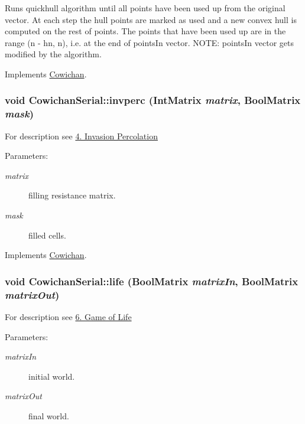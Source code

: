 Runs quickhull algorithm until all points have been used up from the original vector. At each step the hull points are marked as used and a new convex hull is computed on the rest of points. The points that have been used up are in the range (n - hn, n), i.e. at the end of pointsIn vector. NOTE: pointsIn vector gets modified by the algorithm. 

Implements \hyperlink{class_cowichan_0c6b68ae3c059b66893405f8530a2e0a}{Cowichan}.\hypertarget{class_cowichan_serial_9b1cf3fcbb40498609826433b8ea2f6a}{
\subsubsection[{invperc}]{\setlength{\rightskip}{0pt plus 5cm}void CowichanSerial::invperc ({\bf IntMatrix} {\em matrix}, \/  {\bf BoolMatrix} {\em mask})}}
\label{class_cowichan_serial_9b1cf3fcbb40498609826433b8ea2f6a}


For description see \hyperlink{index_invperc_sec}{4. Invasion Percolation} \begin{Desc}
\item[Parameters:]
\begin{description}
\item[{\em matrix}]filling resistance matrix. \item[{\em mask}]filled cells. \end{description}
\end{Desc}


Implements \hyperlink{class_cowichan_ea126792a31e54a8722663b7ea768955}{Cowichan}.\hypertarget{class_cowichan_serial_ffd5b022c1d24226e11924094d8af349}{
\subsubsection[{life}]{\setlength{\rightskip}{0pt plus 5cm}void CowichanSerial::life ({\bf BoolMatrix} {\em matrixIn}, \/  {\bf BoolMatrix} {\em matrixOut})}}
\label{class_cowichan_serial_ffd5b022c1d24226e11924094d8af349}


For description see \hyperlink{index_life_sec}{6. Game of Life} \begin{Desc}
\item[Parameters:]
\begin{description}
\item[{\em matrixIn}]initial world. \item[{\em matrixOut}]final world. \end{description}
\end{Desc}


